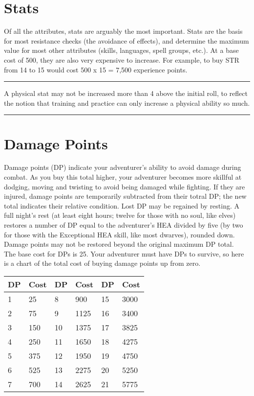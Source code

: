 \begin{multicols*}{2}
\section{Stats}
Of all the attributes, stats are arguably the most important. Stats are the basis for most resistance checks (the avoidance of effects), and determine the maximum value for most other attributes (skills, languages, spell groups, etc.). At a base cost of 500, they are also very expensive to increase. For example, to buy STR from 14 to 15 would cost 500 x 15 = 7,500 experience points.
\hrule
A physical stat may not be increased more than 4 above the initial roll, to reflect the notion that training and practice can only increase a physical ability so much.
\hrule
\section{Damage Points}
Damage points (DP) indicate your adventurer's ability to avoid damage during combat. As you buy this total higher, your adventurer becomes more skillful at dodging, moving and twisting to avoid being damaged while fighting. If they are injured, damage points are temporarily subtracted from their totral DP; the new total indicates their relative condition.
Lost DP may be regained by resting. A full night’s rest (at least eight hours; twelve for those with no soul, like elves) restores a number of DP equal to the adventurer’s HEA divided by five (by two for those with the Exceptional HEA skill, like most dwarves), rounded down. Damage points may not be restored beyond the original maximum DP total. \\
The base cost for DPs is 25. Your adventurer must have DPs to survive, so here is a chart of the total cost of buying damage points up from zero.

\begin{tcolorbox}[breakable,boxrule=0pt]
\begin{tabular}{l l|l l|l l}
DP & Cost & DP & Cost & DP & Cost\\
\midrule
1 & 25 & 8 & 900 & 15 & 3000\\
2 & 75 & 9 & 1125 & 16 & 3400\\
3 & 150 & 10 & 1375 & 17 & 3825\\
4 & 250 & 11 & 1650 & 18 & 4275\\
5 & 375 & 12 & 1950 & 19 & 4750\\
6 & 525 & 13 & 2275 & 20 & 5250\\
7 & 700 & 14 & 2625 & 21 & 5775\\
\end{tabular}
\end{tcolorbox}


\end{multicols*}
